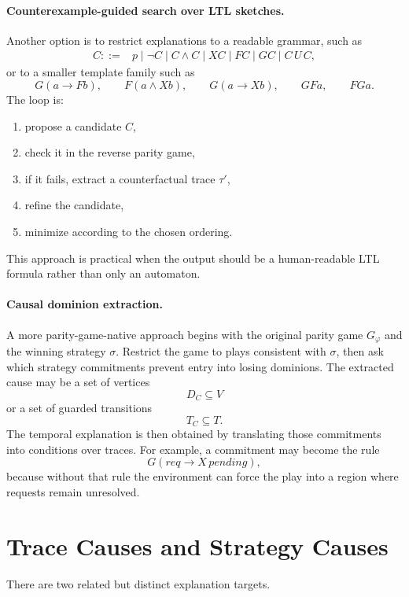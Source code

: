 \documentclass[11pt]{article}
\theoremstyle{remark}
\begin{document}
\paragraph{Counterexample-guided search over LTL sketches.}
Another option is to restrict explanations to a readable grammar, such as
\[
\begin{aligned}
  C ::= {}& p
  \mid \neg C
  \mid C\land C
  \mid X C
  \mid F C
  \mid G C
  \mid C\,U\,C ,
\end{aligned}
\]
or to a smaller template family such as
\[
  G(a\rightarrow F b),\qquad
  F(a\land X b),\qquad
  G(a\rightarrow X b),\qquad
  GF a,\qquad
  FG a .
\]
The loop is:
\begin{enumerate}[label=\arabic*.]
  \item propose a candidate \(C\),
  \item check it in the reverse parity game,
  \item if it fails, extract a counterfactual trace \(\tau'\),
  \item refine the candidate,
  \item minimize according to the chosen ordering.
\end{enumerate}
This approach is practical when the output should be a human-readable LTL
formula rather than only an automaton.

\paragraph{Causal dominion extraction.}
A more parity-game-native approach begins with the original parity game
\(G_\varphi\) and the winning strategy \(\sigma\). Restrict the game to plays
consistent with \(\sigma\), then ask which strategy commitments prevent entry
into losing dominions. The extracted cause may be a set of vertices
\[
  D_C\subseteq V
\]
or a set of guarded transitions
\[
  T_C\subseteq T .
\]
The temporal explanation is then obtained by translating those commitments into
conditions over traces. For example, a commitment may become the rule
\[
  G(req\rightarrow X\,pending),
\]
because without that rule the environment can force the play into a region where
requests remain unresolved.

\section{Trace Causes and Strategy Causes}
\label{sec:trace-strategy}

There are two related but distinct explanation targets.
\end{document}
